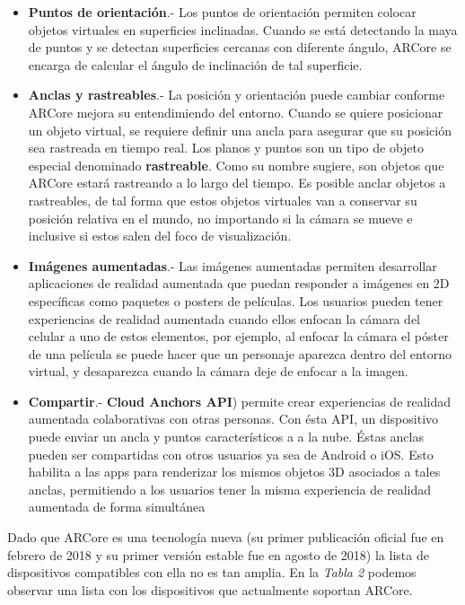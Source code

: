 \begin{itemize}
	\item \textbf{Puntos de orientación}.- Los puntos de orientación permiten colocar objetos virtuales en superficies inclinadas. Cuando se está detectando la maya de puntos y se detectan superficies cercanas con diferente ángulo, ARCore se encarga de calcular el ángulo de inclinación de tal superficie.
	
	\item \textbf{Anclas y rastreables}.- La posición y orientación puede cambiar conforme ARCore mejora su entendimiendo del entorno. Cuando se quiere posicionar un objeto virtual, se requiere definir una ancla para asegurar que su posición sea rastreada en tiempo real. Los planos y puntos son un tipo de objeto especial denominado \textbf{rastreable}. Como su nombre sugiere, son objetos que ARCore estará rastreando a lo largo del tiempo. Es posible anclar objetos a rastreables, de tal forma que estos objetos virtuales van a conservar su posición relativa en el mundo, no importando si la cámara se mueve e inclusive si estos salen del foco de visualización.
	
	\item \textbf{Imágenes aumentadas}.- Las imágenes aumentadas permiten desarrollar aplicaciones de realidad aumentada que puedan responder a imágenes en 2D específicas como paquetes o posters de películas. Los usuarios pueden tener experiencias de realidad aumentada cuando ellos enfocan la cámara del celular a uno de estos elementos, por ejemplo, al enfocar la cámara el póster de una película se puede hacer que un personaje aparezca dentro del entorno virtual, y desaparezca cuando la cámara deje de enfocar a la imagen.
	
	\item \textbf{Compartir}.- \textbf{Cloud Anchors API}) permite crear experiencias de realidad aumentada colaborativas con otras personas. Con ésta API, un dispositivo puede enviar un ancla y puntos característicos a a la nube. Éstas anclas pueden ser compartidas con otros usuarios ya sea de Android o iOS. Esto habilita a las apps para renderizar los mismos objetos 3D asociados a tales anclas, permitiendo a los usuarios tener la misma experiencia de realidad aumentada de forma simultánea
	
\end{itemize}

\noindent
Dado que ARCore es una tecnología nueva (su primer publicación oficial fue en febrero de 2018 y su primer versión estable fue en agosto de 2018) la lista de dispositivos compatibles con ella no es tan amplia. En la \textit{Tabla 2} podemos observar una lista con los dispositivos que actualmente soportan ARCore.\cite{B14}

